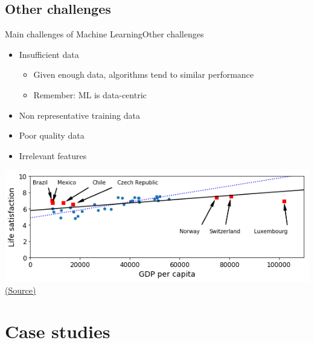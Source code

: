 \documentclass[10pt,compress]{beamer} %
\begin{document}
\subsection{Other challenges}
\begin{frame}{Main challenges of Machine Learning}{Other challenges}
	\begin{itemize}
    	\item Insufficient data
			\begin{itemize}
				\item Given enough data, algorithms tend to similar performance
				\item Remember: ML is data-centric
			\end{itemize}
		\item Non representative training data
		\item Poor quality data
		\item Irrelevant features
    \end{itemize}
	
	\bigskip
	\begin{center}
	\includegraphics[width=0.6\linewidth]{figs/trainingsample.png}\\
    \tiny{\href{https://github.com/ageron/handson-ml/blob/master/01_the_machine_learning_landscape.ipynb}{(Source)}}
	\end{center}
\end{frame}

\section{Case studies}
\end{document}
